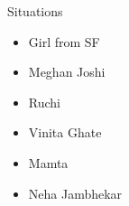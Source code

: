 \documentclass[serif, mathserif, final]{beamer}
\begin{document}
\begin{frame}{}
\begin{columns}
\begin{column}{0.20\linewidth}
\begin{block}{Situations}
\begin{itemize}
    \end{itemize} 

  \end{block}

\begin{block} 

\begin{itemize} 
\small \item \small Girl from SF 
\small \item \small Meghan Joshi 
\small \item \small Ruchi 
\small \item \small Vinita Ghate 

\small \item \small Mamta
\small \item \small Neha Jambhekar 


\end{itemize} 

\end{block} 
\end{column}%

\end{columns}

\end{frame}
\end{document}
